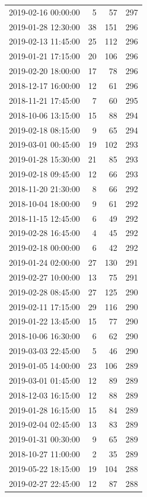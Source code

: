 \begin{tabular}{lrrr}
2019-02-16 00:00:00 & 5 & 57 & 297 \\
2019-01-28 12:30:00 & 38 & 151 & 296 \\
2019-02-13 11:45:00 & 25 & 112 & 296 \\
2019-01-21 17:15:00 & 20 & 106 & 296 \\
2019-02-20 18:00:00 & 17 & 78 & 296 \\
2018-12-17 16:00:00 & 12 & 61 & 296 \\
2018-11-21 17:45:00 & 7 & 60 & 295 \\
2018-10-06 13:15:00 & 15 & 88 & 294 \\
2019-02-18 08:15:00 & 9 & 65 & 294 \\
2019-03-01 00:45:00 & 19 & 102 & 293 \\
2019-01-28 15:30:00 & 21 & 85 & 293 \\
2019-02-18 09:45:00 & 12 & 66 & 293 \\
2018-11-20 21:30:00 & 8 & 66 & 292 \\
2018-10-04 18:00:00 & 9 & 61 & 292 \\
2018-11-15 12:45:00 & 6 & 49 & 292 \\
2019-02-28 16:45:00 & 4 & 45 & 292 \\
2019-02-18 00:00:00 & 6 & 42 & 292 \\
2019-01-24 02:00:00 & 27 & 130 & 291 \\
2019-02-27 10:00:00 & 13 & 75 & 291 \\
2019-02-28 08:45:00 & 27 & 125 & 290 \\
2019-02-11 17:15:00 & 29 & 116 & 290 \\
2019-01-22 13:45:00 & 15 & 77 & 290 \\
2018-10-06 16:30:00 & 6 & 62 & 290 \\
2019-03-03 22:45:00 & 5 & 46 & 290 \\
2019-01-05 14:00:00 & 23 & 106 & 289 \\
2019-03-01 01:45:00 & 12 & 89 & 289 \\
2018-12-03 16:15:00 & 12 & 88 & 289 \\
2019-01-28 16:15:00 & 15 & 84 & 289 \\
2019-02-04 02:45:00 & 13 & 83 & 289 \\
2019-01-31 00:30:00 & 9 & 65 & 289 \\
2018-10-27 11:00:00 & 2 & 35 & 289 \\
2019-05-22 18:15:00 & 19 & 104 & 288 \\
2019-02-27 22:45:00 & 12 & 87 & 288 \\

\end{tabular}
